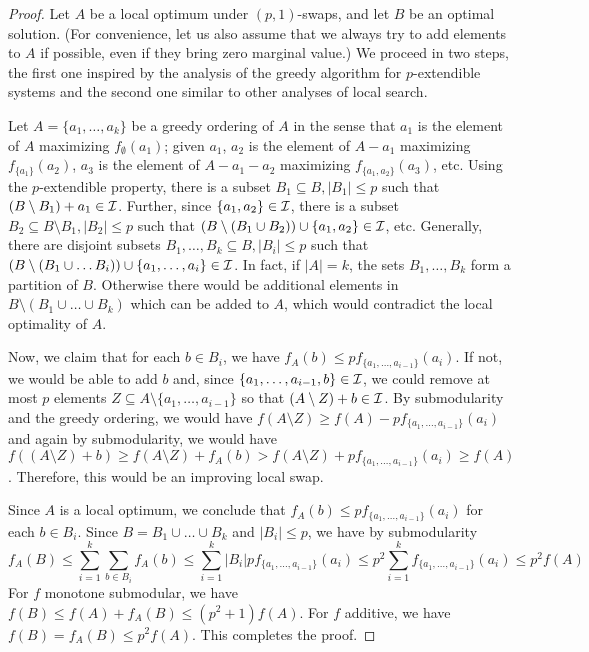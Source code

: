 \begin{proof}
Let $A$ be a local optimum under $(p,1)$-swaps, and let $B$ be an optimal solution. (For convenience, let us also assume that we always try to add elements to $A$ if possible, even if they bring zero marginal value.) We proceed in two steps, the first one inspired by the analysis of the greedy algorithm for $p$-extendible systems \cite{calinescu2011maximizing} and the second one similar to other analyses of local search.

Let $A = \{a_1,\ldots,a_k\}$ be a greedy ordering of $A$ in the sense that $a_1$ is the element of $A$ maximizing $f_\emptyset(a_1)$; given $a_1$, $a_2$ is the element of $A-a_1$ maximizing $f_{\{a_1\}}(a_2)$, $a_3$ is the element of $A-a_1-a_2$ maximizing $f_{\{a_1,a_2\}}(a_3)$, etc. Using the $p$-extendible property, there is a subset $B_1 \subseteq B, |B_1| \leq p$ such that $(B \setminus B_1) + a_1 \in \mathcal{I}$. Further, since $\{a_1,a_2\} \in \mathcal{I}$, there is a subset $B_2 \subseteq B \setminus B_1, |B_2|\leq p$ such that $(B \setminus (B_1 \cup B_2)) \cup \{a_1,a_2\} \in \mathcal{I}$, etc. Generally, there are disjoint subsets $B_1,\ldots,B_k \subseteq B, |B_i| \leq p$ such that $(B \setminus (B_1 \cup \ldots B_i)) \cup \{a_1,\ldots,a_i\} \in \mathcal{I}$. In fact, if $|A| = k$, the sets $B_1,\ldots,B_k$ form a partition of $B$. Otherwise there would be additional elements in $B \setminus (B_1 \cup \ldots \cup B_k)$ which can be added to $A$, which would contradict the local optimality of $A$.

Now, we claim that for each $b \in B_i$, we have $f_A(b) \leq p f_{\{a_1,\ldots,a_{i-1}\}}(a_i)$. If not, we would be able to add $b$ and, since $\{a_1,\ldots,a_{i-1},b\} \in \mathcal{I}$, we could remove at most $p$ elements $Z \subseteq A \setminus \{a_1,\ldots,a_{i-1}\}$ so that $(A \setminus Z) + b \in \mathcal{I}$. By submodularity and the greedy ordering, we would have $f(A \setminus Z) \geq f(A) - p f_{\{a_1,\ldots,a_{i-1}\}}(a_i)$ and again by submodularity, we would have $f((A \setminus Z) + b) \geq f(A \setminus Z) + f_A(b) > f(A \setminus Z) + p f_{\{a_1,\ldots,a_{i-1}\}}(a_i) \geq f(A)$. Therefore, this would be an improving local swap.

Since $A$ is a local optimum, we conclude that $f_A(b) \leq p f_{\{a_1,\ldots,a_{i-1}\}}(a_i)$ for each $b \in B_i$. Since $B = B_1 \cup \ldots \cup B_k$ and $|B_i| \leq p$, we have by submodularity
$$ f_A(B) \leq \sum_{i=1}^{k} \sum_{b \in B_i} f_A(b) \leq \sum_{i=1}^{k} |B_i| p f_{\{a_1,\ldots,a_{i-1}\}}(a_i)
\leq p^2 \sum_{i=1}^{k} f_{\{a_1,\ldots,a_{i-1}\}}(a_i) \leq p^2 f(A) $$
For $f$ monotone submodular, we have $f(B) \leq f(A) + f_A(B) \leq (p^2+1) f(A)$.
For $f$ additive, we have $f(B) = f_A(B) \leq p^2 f(A)$. This completes the proof.
\end{proof}

